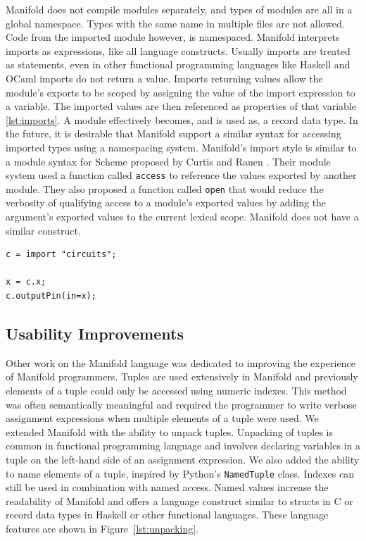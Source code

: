 Manifold does not compile modules separately, and types of modules are all in a global namespace.
Types with the same name in multiple files are not allowed. Code from the imported module however,
is namespaced. Manifold interprets imports as expressions, like all language constructs. Usually
imports are treated as statements, even in other functional programming languages like Haskell and
OCaml imports do not return a value.  Imports returning values allow the module's exports to be
scoped by assigning the value of the import expression to a variable. The imported values are then
referenced as properties of that variable \ref{lst:imports}. A module effectively becomes, and is
used as, a record data type. In the future, it is desirable that Manifold support a similar syntax
for accessing imported types using a namespacing system. Manifold's import style is similar to a
module syntax for Scheme proposed by Curtis and Rauen \cite{Curtis:1990:MSS:91556.91573}. Their
module system used a function called \texttt{access} to reference the values exported by another
module. They also proposed a function called \texttt{open} that would reduce the verbosity of
qualifying access to a module's exported values by adding the argument's exported values to the
current lexical scope. Manifold does not have a similar construct.

\begin{lstlisting}[label=lst:imports, caption=A module imported into a Manifold file]
c = import "circuits";

x = c.x;
c.outputPin(in=x);
\end{lstlisting}

\subsection{Usability Improvements}

Other work on the Manifold language was dedicated to improving the experience
of Manifold programmers. Tuples are used extensively in Manifold and
previously elements of a tuple could only be accessed using numeric indexes.
This method was often semantically meaningful and required the programmer to
write verbose assignment expressions when multiple elements of a tuple were
used. We extended Manifold with the ability to unpack tuples. Unpacking of
tuples is common in functional programming language and involves declaring
variables in a tuple on the left-hand side of an assignment expression. We
also added the ability to name elements of a tuple, inspired by Python's
\texttt{NamedTuple} class. Indexes can still be used in combination with named
access. Named values increase the readability of Manifold and offers a
language construct similar to structs in C or record data types in Haskell or
other functional languages. These language features are shown in
Figure~\ref{lst:unpacking}.

